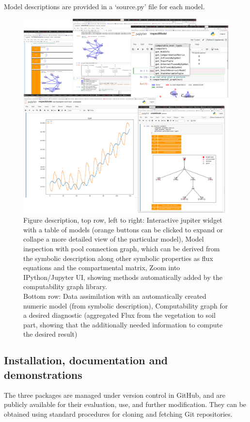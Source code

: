 \documentclass[a4paper]{article}
\begin{document}
Model descriptions are provided in a `source.py' file for each model.

\begin{figure}[t]
\includegraphics[width=\columnwidth]{TabScreenCombined.pdf}
  \caption{
      Figure description, top row, left to right: Interactive jupiter widget
      with a table of models (orange buttons can be clicked to expand or
      collape a more detailed view of the particular model), Model inspection
      with pool connection graph, which can be derived from the symbolic
      description along other symbolic properties as flux equations and the
      compartmental matrix, Zoom into IPython/Jupyter UI, showing methods
      automatically added by the computability graph library.  \\ Bottom row:
      Data assimilation with an automatically created numeric model (from
      symbolic description), Computability graph for a desired diagnostic
      (aggregated Flux from the vegetation to soil part, showing that the
      additionally needed information to compute the desired result)
  }
\end{figure}

\subsection{Installation, documentation and demonstrations}
The three packages are managed under version control in GitHub, and are publicly available for their evaluation, use, and further modification. They can be obtained using standard procedures for cloning and fetching Git repositories. 
\end{document}
